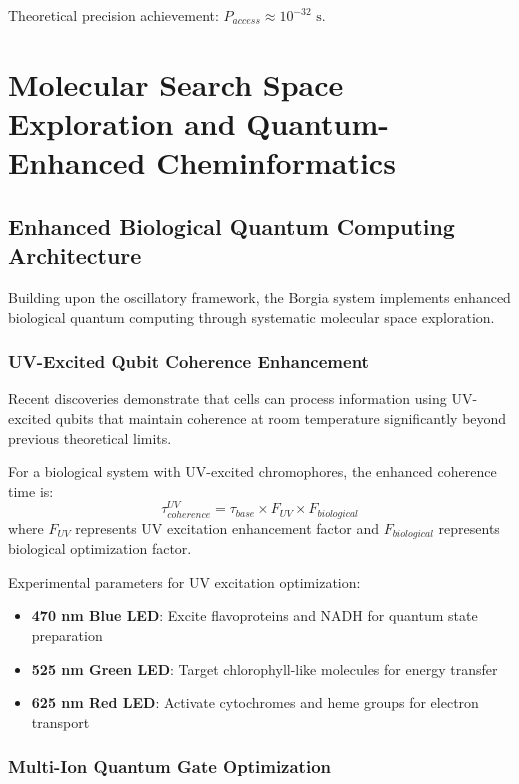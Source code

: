 ﻿\documentclass[11pt,a4paper]{article}
\begin{document}
Theoretical precision achievement: $P_{access} \approx 10^{-32} \text{ s}$.

\section{Molecular Search Space Exploration and Quantum-Enhanced Cheminformatics}

\subsection{Enhanced Biological Quantum Computing Architecture}

Building upon the oscillatory framework, the Borgia system implements enhanced biological quantum computing through systematic molecular space exploration.

\subsubsection{UV-Excited Qubit Coherence Enhancement}

Recent discoveries demonstrate that cells can process information using UV-excited qubits that maintain coherence at room temperature significantly beyond previous theoretical limits.

\begin{definition}
For a biological system with UV-excited chromophores, the enhanced coherence time is:
\begin{equation}
\tau_{coherence}^{UV} = \tau_{base} \times F_{UV} \times F_{biological}
\end{equation}
where $F_{UV}$ represents UV excitation enhancement factor and $F_{biological}$ represents biological optimization factor.
\end{definition}

Experimental parameters for UV excitation optimization:
\begin{itemize}
\item \textbf{470 nm Blue LED}: Excite flavoproteins and NADH for quantum state preparation
\item \textbf{525 nm Green LED}: Target chlorophyll-like molecules for energy transfer  
\item \textbf{625 nm Red LED}: Activate cytochromes and heme groups for electron transport
\end{itemize}

\subsubsection{Multi-Ion Quantum Gate Optimization}
\end{document}
